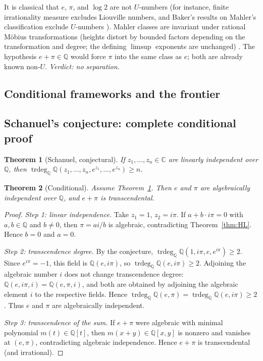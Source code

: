 \documentclass[11pt]{amsart}
\newtheorem{theorem}{Theorem}[section]
\theoremstyle{definition}
\theoremstyle{remark}
\numberwithin{equation}{section}
\newcommand{\Q}{\mathbb{Q}}
\newcommand{\C}{\mathbb{C}}
\newcommand{\trdeg}{\operatorname{trdeg}}
\newcommand{\ee}{e}
\begin{document}
It is classical that $\ee$, $\pi$, and $\log2$ are not $U$-numbers (for instance, finite irrationality measure excludes Liouville numbers, and Baker's results on Mahler's classification exclude $U$-numbers \cite{Baker}). Mahler classes are invariant under rational M\"obius transformations (heights distort by bounded factors depending on the transformation and degree; the defining $\limsup$ exponents are unchanged) \cite{Baker,HuberWustholz2022}. The hypothesis $e+\pi\in\Q$ would force $\pi$ into the same class as $\ee$; both are already known non-$U$. \emph{Verdict: no separation.}

\subsection*{Conditional frameworks and the frontier}

\subsection{Schanuel's conjecture: complete conditional proof}\label{sec:conditional}

\begin{theorem}[Schanuel, conjectural]\label{thm:schanuel}
If $z_1,\dots,z_n\in\C$ are linearly independent over $\Q$, then $\trdeg_\Q\Q(z_1,\dots,z_n,\ee^{z_1},\dots,\ee^{z_n})\ge n$.
\end{theorem}

\begin{theorem}[Conditional]\label{thm:schanuel-consequence}
Assume Theorem~\ref{thm:schanuel}. Then $\ee$ and $\pi$ are algebraically independent over $\Q$, and $e+\pi$ is transcendental.
\end{theorem}

\begin{proof}
\emph{Step 1: linear independence.} Take $z_1=1$, $z_2=i\pi$. If $a+b\cdot i\pi=0$ with $a,b\in\Q$ and $b\ne0$, then $\pi=ai/b$ is algebraic, contradicting Theorem~\ref{thm:HL}. Hence $b=0$ and $a=0$.

\emph{Step 2: transcendence degree.} By the conjecture, $\trdeg_\Q\Q(1,i\pi,\ee,\ee^{i\pi})\ge2$. Since $\ee^{i\pi}=-1$, this field is $\Q(\ee,i\pi)$, so $\trdeg_\Q\Q(\ee,i\pi)\ge2$. Adjoining the algebraic number $i$ does not change transcendence degree: $\Q(\ee,i\pi,i)=\Q(\ee,\pi,i)$, and both are obtained by adjoining the algebraic element $i$ to the respective fields. Hence $\trdeg_\Q\Q(\ee,\pi)=\trdeg_\Q\Q(\ee,i\pi)\ge2$. Thus $\ee$ and $\pi$ are algebraically independent.

\emph{Step 3: transcendence of the sum.} If $e+\pi$ were algebraic with minimal polynomial $m(t)\in\Q[t]$, then $m(x+y)\in\Q[x,y]$ is nonzero and vanishes at $(\ee,\pi)$, contradicting algebraic independence. Hence $e+\pi$ is transcendental (and irrational).
\end{proof}
\end{document}
